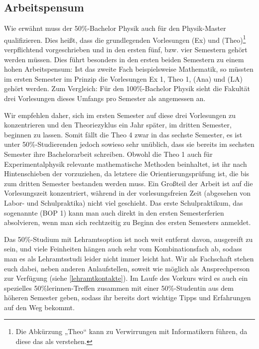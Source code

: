\subsection{Arbeitspensum}
Wie erwähnt muss der 50\%-Bachelor Physik auch für den Physik-Master qualifizieren. Dies heißt, dass die grundlegenden Vorlesungen  (\gls{Ex}) und  (\gls{Theo})\footnote{Die Abkürzung „Theo“ kann zu Verwirrungen mit Informatikern führen, da diese das als  verstehen.} verpflichtend vorgeschrieben und in den ersten fünf, bzw. vier Semestern gehört werden müssen. Dies führt besonders in den ersten beiden Semestern zu einem hohen Arbeitspensum: Ist das zweite Fach beispielsweise Mathematik, so müssten im ersten Semester im Prinzip die Vorlesungen \gls{Ex} 1, \gls{Theo} 1,  (\gls{Ana}) und  (\gls{LA}) gehört werden. Zum Vergleich: Für den 100\%-Bachelor Physik sieht die Fakultät drei Vorlesungen dieses Umfangs pro Semester als angemessen an.

Wir empfehlen daher, sich im ersten Semester auf diese drei Vorlesungen zu konzentrieren und den Theoriezyklus ein Jahr später, im dritten Semester, beginnen zu lassen. Somit fällt die \gls{Theo} 4 zwar in das sechste Semester, es ist unter 50\%-Studierenden jedoch sowieso sehr unüblich, dass sie bereits im sechsten Semester ihre Bachelorarbeit schreiben. Obwohl die \gls{Theo} 1 auch für Experimentalphysik relevante mathematische Methoden beinhaltet, ist ihr nach Hintenschieben der  vorzuziehen, da letztere die Orientierungsprüfung ist, die bis zum dritten Semester bestanden werden muss. Ein Großteil der Arbeit ist auf die Vorlesungszeit konzentriert, während in der vorlesungsfreien Zeit (abgesehen von Labor- und Schulpraktika) nicht viel geschieht. Das erste Schulpraktikum, das sogenannte  (BOP 1) kann man auch direkt in den ersten Semesterferien absolvieren, wenn man sich rechtzeitig zu Beginn des ersten Semesters anmeldet.

Das 50\%-Studium mit Lehramtsoption ist noch weit entfernt davon, ausgereift zu sein, und viele Feinheiten hängen auch sehr vom Kombinationsfach ab, sodass man es als Lehramtsstudi leider nicht immer leicht hat. Wir als Fachschaft stehen euch dabei, neben anderen Anlaufstellen, soweit wie möglich als Ansprechperson zur Verfügung (siehe \autoref{lehramtkontakte}). Im Laufe des Vorkurs wird es auch ein spezielles 50\%lerinnen-Treffen zusammen mit einer 50\%-Studentin aus dem höheren Semester geben, sodass ihr bereits dort wichtige Tipps und Erfahrungen auf den Weg bekommt.

